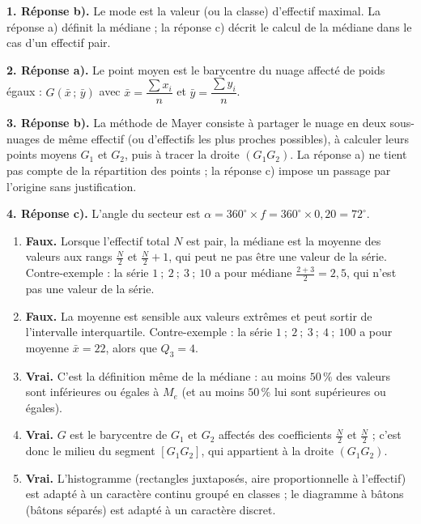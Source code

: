 \documentclass[11pt]{article}
\newcommand{\cle}[1]{{\popxbold\color{popdark}#1}}
\begin{document}
\begin{corrige}
\textbf{1. Réponse b).} Le mode est la valeur (ou la classe) d'\cle{effectif maximal}. La réponse a) définit la médiane ; la réponse c) décrit le calcul de la médiane dans le cas d'un effectif pair.

\textbf{2. Réponse a).} Le point moyen est le barycentre du nuage affecté de poids égaux : $G\left(\bar{x}\,;\,\bar{y}\right)$ avec $\bar{x}=\dfrac{\sum x_i}{n}$ et $\bar{y}=\dfrac{\sum y_i}{n}$.

\textbf{3. Réponse b).} La méthode de Mayer consiste à partager le nuage en deux sous-nuages de même effectif (ou d'effectifs les plus proches possibles), à calculer leurs points moyens $G_1$ et $G_2$, puis à tracer la droite $(G_1G_2)$. La réponse a) ne tient pas compte de la répartition des points ; la réponse c) impose un passage par l'origine sans justification.

\textbf{4. Réponse c).} L'angle du secteur est $\alpha = 360^{\circ}\times f = 360^{\circ}\times 0{,}20 = 72^{\circ}$.
\end{corrige}

\begin{corrige}
\begin{enumerate}
    \item \textbf{Faux.} Lorsque l'effectif total $N$ est pair, la médiane est la moyenne des valeurs aux rangs $\frac{N}{2}$ et $\frac{N}{2}+1$, qui peut ne pas être une valeur de la série. Contre-exemple : la série $1\ ;\ 2\ ;\ 3\ ;\ 10$ a pour médiane $\frac{2+3}{2}=2{,}5$, qui n'est pas une valeur de la série.
    \item \textbf{Faux.} La moyenne est sensible aux valeurs extrêmes et peut sortir de l'intervalle interquartile. Contre-exemple : la série $1\ ;\ 2\ ;\ 3\ ;\ 4\ ;\ 100$ a pour moyenne $\bar{x}=22$, alors que $Q_3=4$.
    \item \textbf{Vrai.} C'est la définition même de la médiane : au moins $50\,\%$ des valeurs sont inférieures ou égales à $M_e$ (et au moins $50\,\%$ lui sont supérieures ou égales).
    \item \textbf{Vrai.} $G$ est le barycentre de $G_1$ et $G_2$ affectés des coefficients $\frac{N}{2}$ et $\frac{N}{2}$ ; c'est donc le milieu du segment $[G_1G_2]$, qui appartient à la droite $(G_1G_2)$.
    \item \textbf{Vrai.} L'histogramme (rectangles juxtaposés, aire proportionnelle à l'effectif) est adapté à un caractère continu groupé en classes ; le diagramme à bâtons (bâtons séparés) est adapté à un caractère discret.
\end{enumerate}
\end{corrige}
\end{document}
